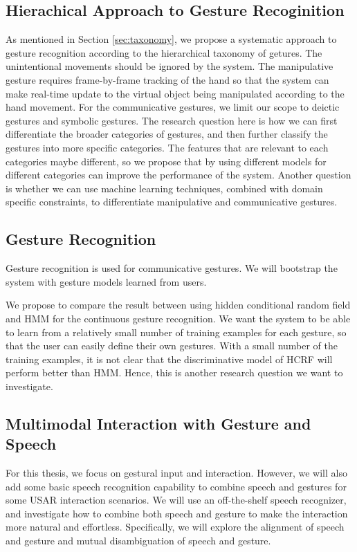 \subsection{Hierachical Approach to Gesture Recoginition}
As mentioned in Section \ref{sec:taxonomy}, we propose a systematic approach to
gesture recognition according to the hierarchical taxonomy of getures. The
unintentional movements should be ignored by the system. The manipulative
gesture requires frame-by-frame tracking of the hand so that the system can make
real-time update to the virtual object being manipulated according to the hand
movement. For the communicative gestures, we limit our scope to deictic gestures
and symbolic gestures. The research question here is how we can first
differentiate the broader categories of gestures, and then further classify the
gestures into more specific categories. The features that are relevant to each
categories maybe different, so we propose that by using different models for
different categories can improve the performance of the system. Another question is
whether we can use machine learning techniques, combined with domain specific
constraints, to differentiate manipulative and communicative gestures.

\subsection{Gesture Recognition}
Gesture recognition is used for communicative
gestures. We will bootstrap the system with gesture models learned from users.

We propose to compare the result between using hidden conditional random field
and HMM for the continuous gesture recognition. We want the system to be able to
learn from a relatively small number of training examples for each gesture, so
that the user can easily define their own gestures. With a small number of the
training examples, it is not clear that the discriminative model of HCRF will
perform better than HMM. Hence, this is another research question we want to
investigate.

\subsection{Multimodal Interaction with Gesture and Speech} 
For this thesis, we focus on gestural input and interaction. However, we will
also add some basic speech recognition capability to combine speech and gestures
for some USAR interaction scenarios. We will use an off-the-shelf speech 
recognizer, and investigate how to combine both speech and gesture to make
the interaction more natural and effortless. Specifically, we will explore the
alignment of speech and gesture and mutual disambiguation of speech and gesture. 

